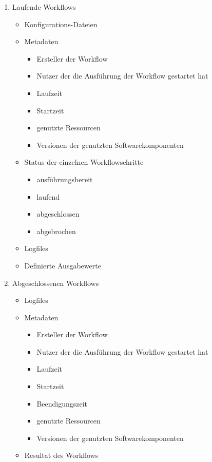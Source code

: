 \begin{enumerate}
    \item Laufende \glspl{Workflow}
    \begin{itemize}
        \setlength\itemsep{-1em}
        \item Konfigurations-Dateien
        \item Metadaten
        \begin{itemize}
            \setlength\itemsep{-1em}
            \item Ersteller der \gls{Workflow}
            \item Nutzer der die Ausführung der \gls{Workflow} gestartet hat
            \item Laufzeit
            \item Startzeit
            \item genutzte Ressourcen
            \item Versionen der genutzten Softwarekomponenten
        \end{itemize}
        \item Status der einzelnen Workflowschritte
        \begin{itemize}
            \setlength\itemsep{-1em}
            \item ausführungsbereit
            \item laufend
            \item abgeschlossen
            \item abgebrochen
        \end{itemize}
        \item Logfiles
        \item Definierte Ausgabewerte
    \end{itemize}
    
    \item Abgeschlossenen \glspl{Workflow}
    \begin{itemize}
        \setlength\itemsep{-1em}
        \item Logfiles
        \item Metadaten
        \begin{itemize}
            \setlength\itemsep{-1em}
            \item Ersteller der \gls{Workflow}
            \item Nutzer der die Ausführung der \gls{Workflow} gestartet hat
            \item Laufzeit
            \item Startzeit
            \item Beendigungszeit
            \item genutzte Ressourcen
            \item Versionen der genutzten Softwarekomponenten
        \end{itemize}
        \item Resultat des Workflows
    \end{itemize}
    

\end{enumerate}
